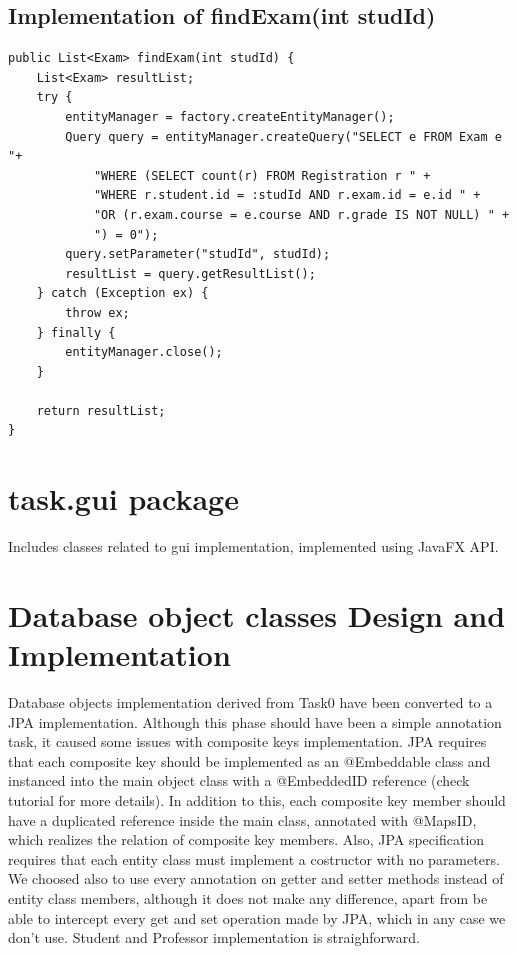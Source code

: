 \documentclass{report}
\begin{document}
\subsection*{Implementation of findExam(int studId)}
\begin{lstlisting}
public List<Exam> findExam(int studId) {
	List<Exam> resultList;
	try {
		entityManager = factory.createEntityManager();
		Query query = entityManager.createQuery("SELECT e FROM Exam e "+
			"WHERE (SELECT count(r) FROM Registration r " +
			"WHERE r.student.id = :studId AND r.exam.id = e.id " +
			"OR (r.exam.course = e.course AND r.grade IS NOT NULL) " +
			") = 0");
		query.setParameter("studId", studId);
		resultList = query.getResultList();
	} catch (Exception ex) {
		throw ex;
	} finally {
		entityManager.close();
	}

	return resultList;
}
\end{lstlisting}

\section*{task.gui package}
Includes classes related to gui implementation, implemented using JavaFX API.

\section*{Database object classes Design and Implementation}
Database objects implementation derived from Task0 have been converted to a JPA implementation. Although this phase should have been a simple annotation task, it caused some issues with composite keys implementation. JPA requires that each composite key should be implemented as an @Embeddable class and instanced into the main object class with a @EmbeddedID reference (check tutorial for more details). In addition to this, each composite key member should have a duplicated reference inside the main class, annotated with @MapsID, which realizes the relation of composite key members. Also, JPA specification requires that each entity class must implement a costructor with no parameters. We choosed also to use every annotation on getter and setter methods instead of entity class members, although it does not make any difference, apart from be able to intercept every get and set operation made by JPA, which in any case we don't use. Student and Professor implementation is straighforward.
\end{document}
